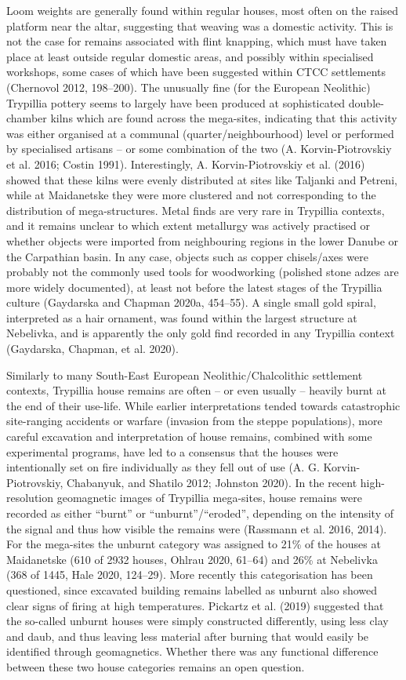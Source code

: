 \documentclass[
  12pt,
  a4paper, twoside]{book}
\begin{document}
Loom weights are generally found within regular houses, most often on the raised platform near the altar, suggesting that weaving was a domestic activity. This is not the case for remains associated with flint knapping, which must have taken place at least outside regular domestic areas, and possibly within specialised workshops, some cases of which have been suggested within CTCC settlements (Chernovol 2012, 198--200). The unusually fine (for the European Neolithic) Trypillia pottery seems to largely have been produced at sophisticated double-chamber kilns which are found across the mega-sites, indicating that this activity was either organised at a communal (quarter/neighbourhood) level or performed by specialised artisans -- or some combination of the two (A. Korvin-Piotrovskiy et al. 2016; Costin 1991). Interestingly, A. Korvin-Piotrovskiy et al. (2016) showed that these kilns were evenly distributed at sites like Taljanki and Petreni, while at Maidanetske they were more clustered and not corresponding to the distribution of mega-structures. Metal finds are very rare in Trypillia contexts, and it remains unclear to which extent metallurgy was actively practised or whether objects were imported from neighbouring regions in the lower Danube or the Carpathian basin. In any case, objects such as copper chisels/axes were probably not the commonly used tools for woodworking (polished stone adzes are more widely documented), at least not before the latest stages of the Trypillia culture (Gaydarska and Chapman 2020a, 454--55). A single small gold spiral, interpreted as a hair ornament, was found within the largest structure at Nebelivka, and is apparently the only gold find recorded in any Trypillia context (Gaydarska, Chapman, et al. 2020).

Similarly to many South-East European Neolithic/Chalcolithic settlement contexts, Trypillia house remains are often -- or even usually -- heavily burnt at the end of their use-life. While earlier interpretations tended towards catastrophic site-ranging accidents or warfare (invasion from the steppe populations), more careful excavation and interpretation of house remains, combined with some experimental programs, have led to a consensus that the houses were intentionally set on fire individually as they fell out of use (A. G. Korvin-Piotrovskiy, Chabanyuk, and Shatilo 2012; Johnston 2020). In the recent high-resolution geomagnetic images of Trypillia mega-sites, house remains were recorded as either ``burnt'' or ``unburnt''/``eroded'', depending on the intensity of the signal and thus how visible the remains were (Rassmann et al. 2016, 2014). For the mega-sites the unburnt category was assigned to 21\% of the houses at Maidanetske (610 of 2932 houses, Ohlrau 2020, 61--64) and 26\% at Nebelivka (368 of 1445, Hale 2020, 124--29). More recently this categorisation has been questioned, since excavated building remains labelled as unburnt also showed clear signs of firing at high temperatures. Pickartz et al. (2019) suggested that the so-called unburnt houses were simply constructed differently, using less clay and daub, and thus leaving less material after burning that would easily be identified through geomagnetics. Whether there was any functional difference between these two house categories remains an open question.
\end{document}
